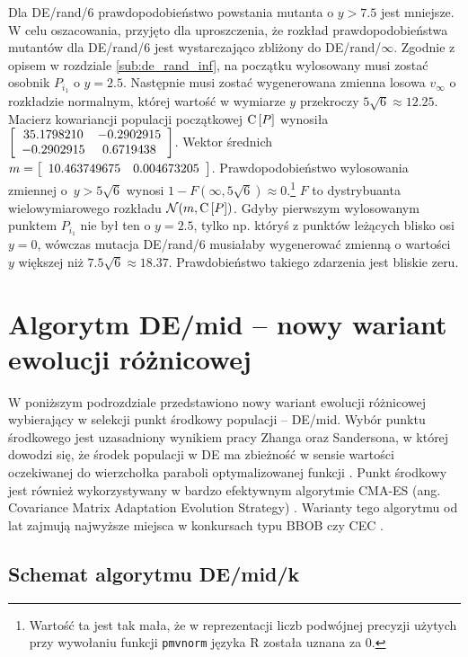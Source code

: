 \documentclass[a4paper,onecolumn,oneside,12pt,wide,floatssmall]{mwrep}
\def\C{{\rm C}\,}
\theoremstyle{definition}
\theoremstyle{plain}%
\theoremstyle{remark}
\begin{document}
Dla DE/rand/6 prawdopodobieństwo powstania mutanta o $y > 7.5$ jest mniejsze.
W celu oszacowania, przyjęto dla uproszczenia, że rozkład prawdopodobieństwa mutantów dla
DE/rand/6 jest wystarczająco zbliżony do DE/rand/$\infty$.
Zgodnie z opisem w rozdziale \ref{sub:de_rand_inf}, na początku wylosowany musi zostać osobnik 
$P_{i_1}$ o $y = 2.5$. Następnie musi zostać wygenerowana zmienna losowa 
$v_\infty$ o rozkładzie normalnym, której wartość w wymiarze $y$
przekroczy $5\sqrt{6} \approx 12.25$. Macierz kowariancji populacji początkowej  
$\C[P]$ wynosiła $\left[ \begin{array}{ c c }
  35.1798210 & -0.2902915 \\
  -0.2902915 &  0.6719438
\end{array} \right]$.
Wektor średnich~$m=\left[ \begin{array}{ c c } 10.463749675 & 0.004673205 \end{array} \right]$.
Prawdopodobieństwo wylosowania zmiennej o~$y > 5\sqrt{6}$ wynosi 
$1 - F(\infty, 5\sqrt{6}) \approx 0$.\footnote{Wartość ta jest tak mała,
że w reprezentacji liczb podwójnej precyzji użytych przy wywołaniu funkcji \texttt{pmvnorm} języka R
została uznana za 0.} $F$ to
dystrybuanta wielowymiarowego rozkładu $\mathcal{N}(m, \C[P])$.
Gdyby pierwszym wylosowanym punktem $P_{i_1}$ nie był ten o $y = 2.5$, tylko np. któryś 
z punktów leżących blisko osi $y = 0$, wówczas mutacja DE/rand/6 musiałaby wygenerować zmienną
o wartości $y$ większej niż $7.5\sqrt{6} \approx 18.37$. 
Prawdobieństwo takiego zdarzenia jest bliskie zeru.

\section{Algorytm DE/mid -- nowy wariant ewolucji różnicowej}

W poniższym podrozdziale przedstawiono nowy wariant ewolucji różnicowej wybierający w selekcji punkt środkowy populacji -- DE/mid.
Wybór punktu środkowego jest uzasadniony wynikiem pracy Zhanga oraz Sandersona, w której dowodzi się, że
środek populacji w DE ma zbieżność w sensie wartości oczekiwanej do wierzchołka paraboli optymalizowanej funkcji
\cite{zhang}. Punkt środkowy jest również wykorzystywany w bardzo efektywnym algorytmie CMA-ES
(ang. Covariance Matrix Adaptation Evolution Strategy) \cite{cmaes}.
Warianty tego algorytmu od lat zajmują najwyższe miejsca w konkursach typu BBOB \cite{setup} czy CEC \cite{cec}.

\subsection{Schemat algorytmu DE/mid/k}
\end{document}
